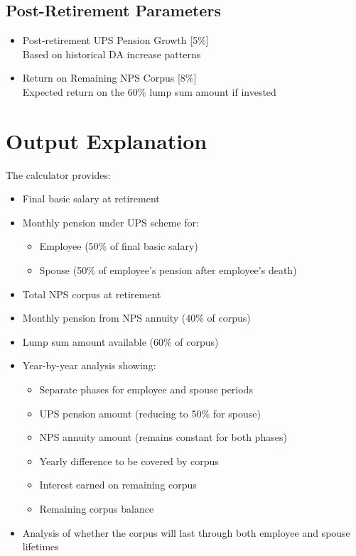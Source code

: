 \documentclass{article}
\begin{document}
\subsection{Post-Retirement Parameters}
\begin{itemize}
    \item Post-retirement UPS Pension Growth [5\%] \\
          Based on historical DA increase patterns
    \item Return on Remaining NPS Corpus [8\%] \\
          Expected return on the 60\% lump sum amount if invested
\end{itemize}

\section{Output Explanation}
The calculator provides:
\begin{itemize}
    \item Final basic salary at retirement
    \item Monthly pension under UPS scheme for:
    \begin{itemize}
        \item Employee (50\% of final basic salary)
        \item Spouse (50\% of employee's pension after employee's death)
    \end{itemize}
    \item Total NPS corpus at retirement
    \item Monthly pension from NPS annuity (40\% of corpus)
    \item Lump sum amount available (60\% of corpus)
    \item Year-by-year analysis showing:
    \begin{itemize}
        \item Separate phases for employee and spouse periods
        \item UPS pension amount (reducing to 50\% for spouse)
        \item NPS annuity amount (remains constant for both phases)
        \item Yearly difference to be covered by corpus
        \item Interest earned on remaining corpus
        \item Remaining corpus balance
    \end{itemize}
    \item Analysis of whether the corpus will last through both employee and spouse lifetimes
\end{itemize}
\end{document}
